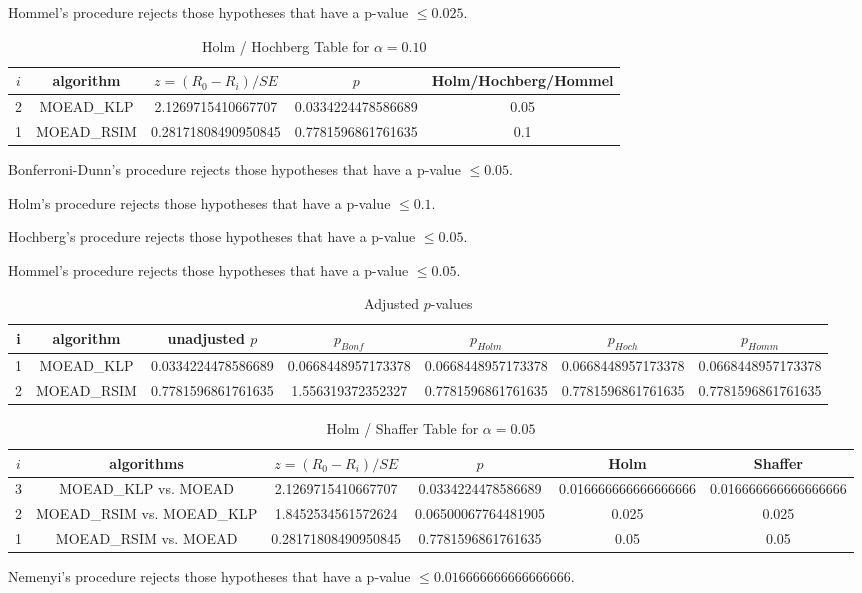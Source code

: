 \documentclass[a4paper,10pt]{article}
\begin{document}
\begin{landscape}
Hommel's procedure rejects those hypotheses that have a p-value $\le0.025$.


\begin{table}[!htp]
\centering\tiny
\caption{Holm / Hochberg Table for $\alpha=0.10$}
\begin{tabular}{ccccc}
$i$&algorithm&$z=(R_0 - R_i)/SE$&$p$&Holm/Hochberg/Hommel\\
\hline
2&MOEAD_KLP&2.1269715410667707&0.0334224478586689&0.05\\
1&MOEAD_RSIM&0.28171808490950845&0.7781596861761635&0.1\\
\hline
\end{tabular}
\end{table}
Bonferroni-Dunn's procedure rejects those hypotheses that have a p-value $\le0.05$.


Holm's procedure rejects those hypotheses that have a p-value $\le0.1$.


Hochberg's procedure rejects those hypotheses that have a p-value $\le0.05$.


Hommel's procedure rejects those hypotheses that have a p-value $\le0.05$.


\begin{table}[!htp]
\centering\tiny
\caption{Adjusted $p$-values}
\begin{tabular}{ccccccc}
i&algorithm&unadjusted $p$&$p_{Bonf}$&$p_{Holm}$&$p_{Hoch}$&$p_{Homm}$\\
\hline
1&MOEAD_KLP&0.0334224478586689&0.0668448957173378&0.0668448957173378&0.0668448957173378&0.0668448957173378\\
2&MOEAD_RSIM&0.7781596861761635&1.556319372352327&0.7781596861761635&0.7781596861761635&0.7781596861761635\\
\hline
\end{tabular}
\end{table}

\begin{table}[!htp]
\centering\tiny
\caption{Holm / Shaffer Table for $\alpha=0.05$}
\begin{tabular}{cccccc}
$i$&algorithms&$z=(R_0 - R_i)/SE$&$p$&Holm&Shaffer\\
\hline
3&MOEAD_KLP vs. MOEAD&2.1269715410667707&0.0334224478586689&0.016666666666666666&0.016666666666666666\\
2&MOEAD_RSIM vs. MOEAD_KLP&1.8452534561572624&0.06500067764481905&0.025&0.025\\
1&MOEAD_RSIM vs. MOEAD&0.28171808490950845&0.7781596861761635&0.05&0.05\\
\hline
\end{tabular}
\end{table}
Nemenyi's procedure rejects those hypotheses that have a p-value $\le0.016666666666666666$.



\end{landscape}
\end{document}
